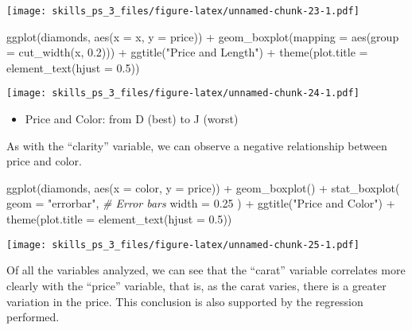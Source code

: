 \documentclass[
]{article}
\newenvironment{Shaded}{\begin{snugshade}}{\end{snugshade}}
\newcommand{\AttributeTok}[1]{\textcolor[rgb]{0.77,0.63,0.00}{#1}}
\newcommand{\CommentTok}[1]{\textcolor[rgb]{0.56,0.35,0.01}{\textit{#1}}}
\newcommand{\FloatTok}[1]{\textcolor[rgb]{0.00,0.00,0.81}{#1}}
\newcommand{\FunctionTok}[1]{\textcolor[rgb]{0.00,0.00,0.00}{#1}}
\newcommand{\NormalTok}[1]{#1}
\newcommand{\SpecialCharTok}[1]{\textcolor[rgb]{0.00,0.00,0.00}{#1}}
\newcommand{\StringTok}[1]{\textcolor[rgb]{0.31,0.60,0.02}{#1}}
\providecommand{\tightlist}{%
  \setlength{\itemsep}{0pt}\setlength{\parskip}{0pt}}
\begin{document}
\texttt{[image: skills\_ps\_3\_files/figure-latex/unnamed-chunk-23-1.pdf]}

\begin{Shaded}
\begin{Highlighting}[]
\FunctionTok{ggplot}\NormalTok{(diamonds, }\FunctionTok{aes}\NormalTok{(}\AttributeTok{x =}\NormalTok{ x, }\AttributeTok{y =}\NormalTok{ price)) }\SpecialCharTok{+} 
  \FunctionTok{geom\_boxplot}\NormalTok{(}\AttributeTok{mapping =} \FunctionTok{aes}\NormalTok{(}\AttributeTok{group =} \FunctionTok{cut\_width}\NormalTok{(x, }\FloatTok{0.2}\NormalTok{)))  }\SpecialCharTok{+}
  \FunctionTok{ggtitle}\NormalTok{(}\StringTok{"Price and Length"}\NormalTok{) }\SpecialCharTok{+}
  \FunctionTok{theme}\NormalTok{(}\AttributeTok{plot.title =} \FunctionTok{element\_text}\NormalTok{(}\AttributeTok{hjust =} \FloatTok{0.5}\NormalTok{))}
\end{Highlighting}
\end{Shaded}

\texttt{[image: skills\_ps\_3\_files/figure-latex/unnamed-chunk-24-1.pdf]}

\begin{itemize}
\tightlist
\item
  Price and Color: from D (best) to J (worst)
\end{itemize}

As with the ``clarity'' variable, we can observe a negative relationship
between price and color.

\begin{Shaded}
\begin{Highlighting}[]
\FunctionTok{ggplot}\NormalTok{(diamonds, }\FunctionTok{aes}\NormalTok{(}\AttributeTok{x =}\NormalTok{ color, }\AttributeTok{y =}\NormalTok{ price)) }\SpecialCharTok{+} 
  \FunctionTok{geom\_boxplot}\NormalTok{() }\SpecialCharTok{+}
  \FunctionTok{stat\_boxplot}\NormalTok{(}
    \AttributeTok{geom =} \StringTok{"errorbar"}\NormalTok{, }\CommentTok{\# Error bars}
    \AttributeTok{width =} \FloatTok{0.25}
\NormalTok{  )  }\SpecialCharTok{+}
  \FunctionTok{ggtitle}\NormalTok{(}\StringTok{"Price and Color"}\NormalTok{) }\SpecialCharTok{+}
  \FunctionTok{theme}\NormalTok{(}\AttributeTok{plot.title =} \FunctionTok{element\_text}\NormalTok{(}\AttributeTok{hjust =} \FloatTok{0.5}\NormalTok{))}
\end{Highlighting}
\end{Shaded}

\texttt{[image: skills\_ps\_3\_files/figure-latex/unnamed-chunk-25-1.pdf]}

Of all the variables analyzed, we can see that the ``carat'' variable
correlates more clearly with the ``price'' variable, that is, as the
carat varies, there is a greater variation in the price. This conclusion
is also supported by the regression performed.
\end{document}
